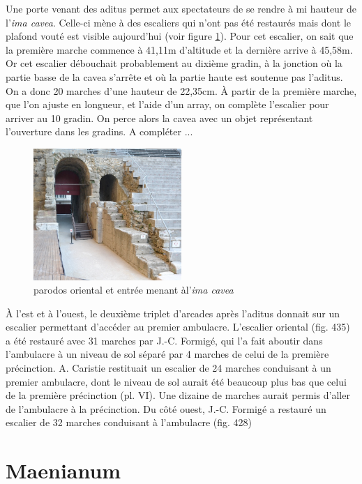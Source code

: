 Une porte venant des aditus permet aux spectateurs de se rendre à mi hauteur de l'\textit{ima cavea}. Celle-ci mène à des escaliers qui n'ont pas été restaurés mais dont le plafond vouté est visible aujourd'hui (voir figure \ref{parodos}). Pour cet escalier, on sait que la première marche commence à 41,11m d'altitude et la dernière arrive à 45,58m. Or cet escalier débouchait probablement au dixième gradin, à la jonction où la partie basse de la cavea s'arrête et où la partie haute est soutenue pas l'aditus. On a donc 20 marches d'une hauteur de 22,35cm. \`{A} partir de la première marche, que l'on ajuste en longueur, et l'aide d'un \gls{array}, on complète l'escalier pour arriver au 10 gradin. On perce alors la cavea avec un objet représentant l'ouverture dans les gradins. A compléter ...


\begin{figure}[!h]
	\centering
	\includegraphics[width=0.5\textwidth]{images/parodos}
	\caption[\Gls{parodos} oriental et entrée menant àl'\textit{ima cavea}]{\Gls{parodos} oriental et entrée menant àl'\textit{ima cavea} \cite[fig. 418]{orangeTxt}} 
	\label{parodos} 
\end{figure}

\`{A} l'est et à l'ouest, le deuxième triplet d'arcades après l'\gls{aditus} donnait sur un escalier permettant d'accéder au premier \gls{ambulacre}. L'escalier oriental (fig. 435) a été restauré avec 31 marches par J.-C. Formigé, qui l'a fait aboutir dans l'ambulacre à un niveau de sol séparé par 4 marches de celui de la première précinction.  A. Caristie restituait un escalier de 24 marches conduisant à un premier ambulacre, dont le niveau de sol aurait été beaucoup plus bas que celui de la première précinction (pl. VI). Une dizaine de
marches aurait permis d'aller de l'ambulacre à la précinction.
Du côté ouest, J.-C. Formigé a restauré un escalier de 32 marches conduisant à
l'ambulacre (fig. 428)


		\section{Maenianum} 


